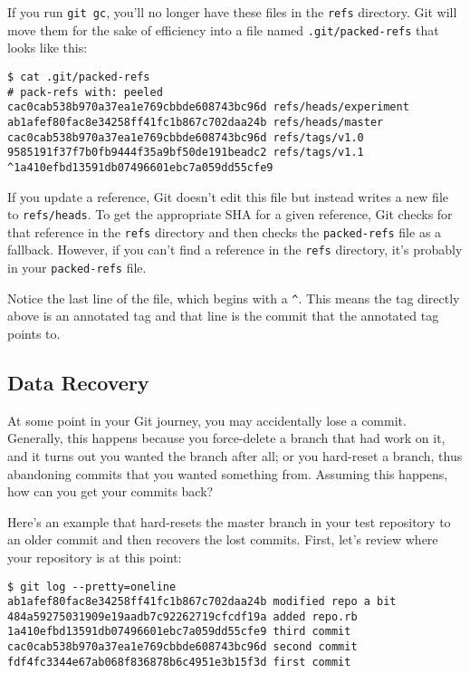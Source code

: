 \documentclass[a4paper]{book}
\begin{document}
If you run \texttt{git gc}, you'll no longer have these files in the \texttt{refs} directory. Git will move them for the sake of efficiency into a file named \texttt{.git/packed-refs} that looks like this:

\begin{shaded}\begin{verbatim}
$ cat .git/packed-refs
# pack-refs with: peeled
cac0cab538b970a37ea1e769cbbde608743bc96d refs/heads/experiment
ab1afef80fac8e34258ff41fc1b867c702daa24b refs/heads/master
cac0cab538b970a37ea1e769cbbde608743bc96d refs/tags/v1.0
9585191f37f7b0fb9444f35a9bf50de191beadc2 refs/tags/v1.1
^1a410efbd13591db07496601ebc7a059dd55cfe9
\end{verbatim}\end{shaded}

If you update a reference, Git doesn't edit this file but instead writes a new file to \texttt{refs/heads}. To get the appropriate SHA for a given reference, Git checks for that reference in the \texttt{refs} directory and then checks the \texttt{packed-refs} file as a fallback. However, if you can't find a reference in the \texttt{refs} directory, it's probably in your \texttt{packed-refs} file.

Notice the last line of the file, which begins with a \texttt{\^{}}. This means the tag directly above is an annotated tag and that line is the commit that the annotated tag points to.

\subsection{Data Recovery}

At some point in your Git journey, you may accidentally lose a commit. Generally, this happens because you force-delete a branch that had work on it, and it turns out you wanted the branch after all; or you hard-reset a branch, thus abandoning commits that you wanted something from. Assuming this happens, how can you get your commits back?

Here's an example that hard-resets the master branch in your test repository to an older commit and then recovers the lost commits. First, let's review where your repository is at this point:

\begin{shaded}\begin{verbatim}
$ git log --pretty=oneline
ab1afef80fac8e34258ff41fc1b867c702daa24b modified repo a bit
484a59275031909e19aadb7c92262719cfcdf19a added repo.rb
1a410efbd13591db07496601ebc7a059dd55cfe9 third commit
cac0cab538b970a37ea1e769cbbde608743bc96d second commit
fdf4fc3344e67ab068f836878b6c4951e3b15f3d first commit
\end{verbatim}\end{shaded}
\end{document}
